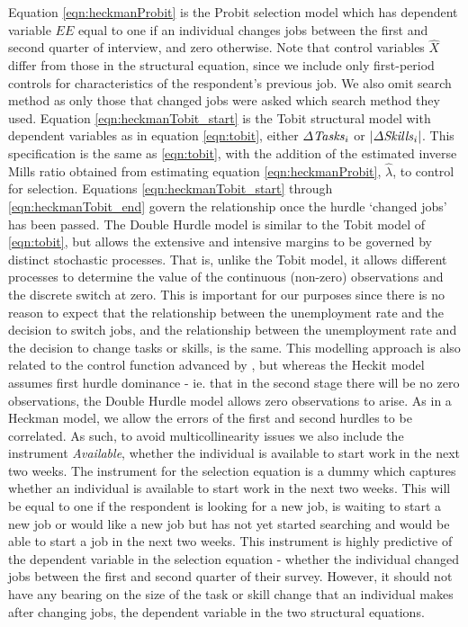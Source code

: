\documentclass[11pt, oneside]{article}
\begin{document}
Equation \ref{eqn:heckmanProbit} is the Probit selection model which has dependent variable $EE$ equal to one if an individual changes jobs between the first and second quarter of interview, and zero otherwise. Note that control variables $\hat{X}$ differ from those in the structural equation, since we include only first-period controls for characteristics of the respondent's previous job. We also omit search method as only those that changed jobs were asked which search method they used.  Equation \ref{eqn:heckmanTobit_start} is the Tobit structural model with dependent variables as in equation \ref{eqn:tobit}, either $\Delta\text{\textit{Tasks}}_{i}$ or $|\Delta\text{\textit{Skills}}_{i}|$. This specification is the same as \ref{eqn:tobit}, with the addition of the estimated inverse Mills ratio obtained from estimating equation \ref{eqn:heckmanProbit}, $\hat{\lambda}$, to control for selection. Equations \ref{eqn:heckmanTobit_start} through \ref{eqn:heckmanTobit_end} govern the relationship once the hurdle `changed jobs' has been passed.  The Double Hurdle model is similar to the Tobit model of \ref{eqn:tobit}, but allows the extensive and intensive margins to be governed by distinct stochastic processes. That is, unlike the Tobit model, it allows different processes to determine the value of the continuous (non-zero) observations and the discrete switch at zero. This is important for our purposes since there is no reason to expect that the relationship between the unemployment rate and the decision to switch jobs, and the relationship between the unemployment rate and the decision to change tasks or skills, is the same. This modelling approach is also related to the control function advanced by \cite{Heckman}, but whereas the Heckit model assumes first hurdle dominance - ie. that in the second stage there will be no zero observations, the Double Hurdle model allows zero observations to arise. As in a Heckman model, we allow the errors of the first and second hurdles to be correlated. As such, to avoid multicollinearity issues we also include the instrument \textit{Available}, whether the individual is available to start work in the next two weeks. The instrument for the selection equation is a dummy which captures whether an individual is available to start work in the next two weeks. This will be equal to one if the respondent is looking for a new job, is waiting to start a new job or would like a new job but has not yet started searching and would be able to start a job in the next two weeks. This instrument is highly predictive of the dependent variable in the selection equation - whether the individual changed jobs between the first and second quarter of their survey. However, it should not have any bearing on the size of the task or skill change that an individual makes after changing jobs, the dependent variable in the two structural equations. 
	
\end{document}
